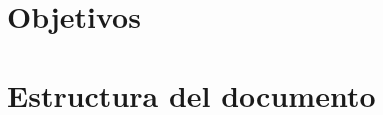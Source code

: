 
\begin{introduction}



\section*{Objetivos}




\section*{Estructura del documento}



\end{introduction}




